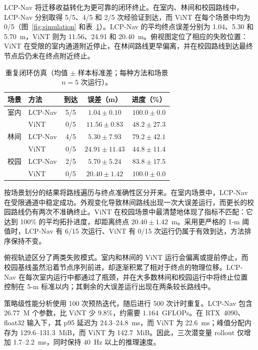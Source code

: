 \documentclass[conference]{IEEEtran}
\begin{document}
LCP-Nav 将迁移收益转化为更可靠的闭环终止。在室内、林间和校园路线中，LCP-Nav 分别取得 5/5、4/5 和 2/5 次经验证到达，而 ViNT 在每个场景中均为 0/5（图~\ref{fig:simulation} 和表~\ref{tab:closedloop}）。LCP-Nav 的平均终点误差分别为 1.04、5.30 和 5.70~m，ViNT 则为 11.56、24.91 和 20.40~m。俯视图定位了相应的失败位置：ViNT 在受限的室内通道附近停止，在林间路线更早偏离，并在校园路线到达最终节点后仍未在终点附近终止。

\begin{table}[t]
\centering
\caption{重复闭环仿真（均值 $\pm$ 样本标准差；每种方法和场景 $n=5$ 次运行）。}
\label{tab:closedloop}
\setlength{\tabcolsep}{3.2pt}
\footnotesize
\begin{tabular}{@{}llccc@{}}
\toprule
场景 & 方法 & 到达 & 误差（m） & 进度（\%） \\
\midrule
室内 & LCP-Nav & 5/5 & $1.04\pm0.10$ & $100.0\pm0.0$ \\
     & ViNT    & 0/5 & $11.56\pm0.83$ & $48.2\pm27.3$ \\
林间 & LCP-Nav & 4/5 & $5.30\pm7.93$ & $79.2\pm42.1$ \\
     & ViNT    & 0/5 & $24.91\pm11.43$ & $44.8\pm11.4$ \\
校园 & LCP-Nav & 2/5 & $5.70\pm5.24$ & $83.8\pm17.5$ \\
     & ViNT    & 0/5 & $20.40\pm1.42$ & $100.0\pm0.0$ \\
\bottomrule
\end{tabular}
\end{table}

按场景划分的结果将路线遍历与终点准确性区分开来。在室内场景中，LCP-Nav 在受限通道中稳定成功。外观变化导致林间路线出现一次大误差运行，而更长的校园路线仍有两次不准确终止。ViNT 在校园场景中最清楚地体现了指标不匹配：它达到 100\% 的平均拓扑进度，却距离终点 $20.40\pm1.42$~m。采用更严格的 1-m 阈值时，LCP-Nav 有 6/15 次运行、ViNT 有 0/15 次运行仍属于有效到达，方法排序保持不变。

俯视轨迹区分了两类失败模式。室内和林间的 ViNT 运行会偏离或提前停止，而校园基线虽然沿着节点序列前进，却逐渐积累了相对于终点的物理位移。LCP-Nav 在每次室内运行中都通过了瓶颈，并在大多数林间和校园运行中将终止位置控制在 5-m 标准以内；其剩余的大误差运行出现在两条较长路线中。

策略级性能分析使用 100 次预热迭代，随后进行 500 次计时重复。LCP-Nav 包含 $26.77$~M 个参数，比 ViNT 少 9.8\%，约需要 $1.164$~GFLOPs。在 RTX~4090、float32 输入下，其 p95 延迟为 24.3--24.8~ms，而 ViNT 为 22.6~ms；峰值分配内存为 129.6--131.3~MiB，而 ViNT 为 142.7~MiB。因此，三次潜变量 rollout 仅增加 1.7--2.2~ms，同时保持 $40$~Hz 以上的推理速度。
\end{document}

